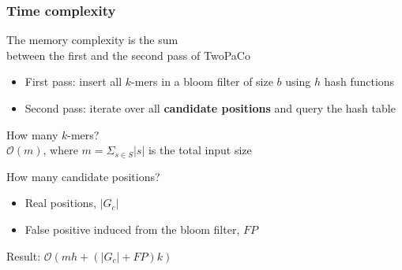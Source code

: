 \begin{frame}
  
	\frametitle{Time complexity}

  \centering
	
	The memory complexity is the sum \\ between the first and the second pass of TwoPaCo \\
	
	\bigskip
	
	\begin{itemize}
	  \item First pass: insert all $k$-mers in a bloom filter of size $b$ using $h$ hash functions
	  \item Second pass: iterate over all \textbf{candidate positions} and query the hash table
	\end{itemize}
	
	\bigskip
	
	How many $k$-mers? \\
	
	$\mathcal{O}(m)$, where $m = \Sigma_{s \in S}{ |s| }$ is the total input size
	
	\bigskip
	 
	How many candidate positions?
	
	\begin{itemize}
	  \item Real positions, $|G_{c}|$
	  \item False positive induced from the bloom filter, $FP$
	\end{itemize}

	\medskip
	
	Result: $\mathcal{O}(mh + (|G_{c}| + FP)k)$
	
	
\end{frame}



